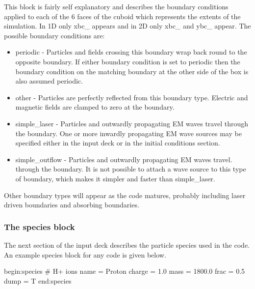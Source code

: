 This block is fairly self explanatory and describes the boundary conditions
applied to each of the 6 faces of the cuboid which represents the extents of
the simulation. In 1D only xbc\_ appears and in 2D only xbc\_ and ybc\_
appear. The possible boundary conditions are:\\
\begin{itemize}
\item periodic - Particles and fields crossing this boundary wrap back round
  to the opposite boundary. If either boundary condition is set to periodic
  then the boundary condition on the matching boundary at the other side of
  the box is also assumed periodic.
\item other - Particles are perfectly reflected from this boundary
  type. Electric and magnetic fields are clamped to zero at the boundary.
\item simple\_laser - Particles and outwardly propagating EM waves travel
  through the boundary. One or more inwardly propagating EM wave sources may
  be specified either in the input deck or in the initial conditions section.
\item simple\_outflow - Particles and outwardly propagating EM waves travel.
  through the boundary. It is not possible to attach a wave source to this
  type of boundary, which makes it simpler and faster than simple\_laser.
\end{itemize}
Other boundary types will appear as the code matures, probably including laser
driven boundaries and absorbing boundaries.\\

\subsubsection{The species block}
The next section of the input deck describes the particle species used in the
code. An example species block for any {\EPOCH} code is given below.
\begin{boxverbatim}
begin:species
   # H+ ions
   name = Proton
   charge = 1.0
   mass = 1800.0
   frac = 0.5
   dump = T
end:species
\end{boxverbatim}

